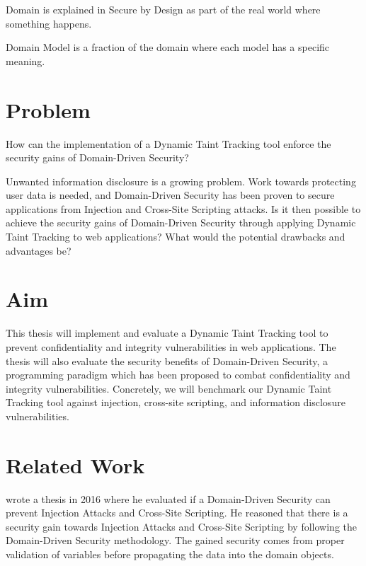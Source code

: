 \begin{definition}{Domain}
    is explained in Secure by Design \parencite{sbd2018} as part of the real world where something happens.
    \\
\end{definition}

\begin{definition}{Domain Model}
    is a fraction of the domain where each model has a specific meaning.
    \\
\end{definition}


\section{Problem}
\label{Problem}
\begin{chapquote}{}
    How can the implementation of a Dynamic Taint Tracking tool enforce the security gains of Domain-Driven Security?
\end{chapquote}

\noindent
Unwanted information disclosure is a growing problem. Work towards protecting user data is needed, and Domain-Driven Security has been proven to secure applications from Injection and Cross-Site Scripting attacks. Is it then possible to achieve the security gains of Domain-Driven Security through applying Dynamic Taint Tracking to web applications? What would the potential drawbacks and advantages be?


\section{Aim}
\label{Aim}
This thesis will implement and evaluate a Dynamic Taint Tracking tool to prevent confidentiality and integrity vulnerabilities in web applications. The thesis will also evaluate the security benefits of Domain-Driven Security, a programming paradigm which has been proposed to combat confidentiality and integrity vulnerabilities. Concretely, we will benchmark our Dynamic Taint Tracking tool against injection, cross-site scripting, and information disclosure vulnerabilities.


\section{Related Work}
\label{RelatedWork}
\textcite{Stendahl2016} wrote a thesis in 2016 where he evaluated if a Domain-Driven Security can prevent Injection Attacks and Cross-Site Scripting. He reasoned that there is a security gain towards Injection Attacks and Cross-Site Scripting by following the Domain-Driven Security methodology. The gained security comes from proper validation of variables before propagating the data into the domain objects.

